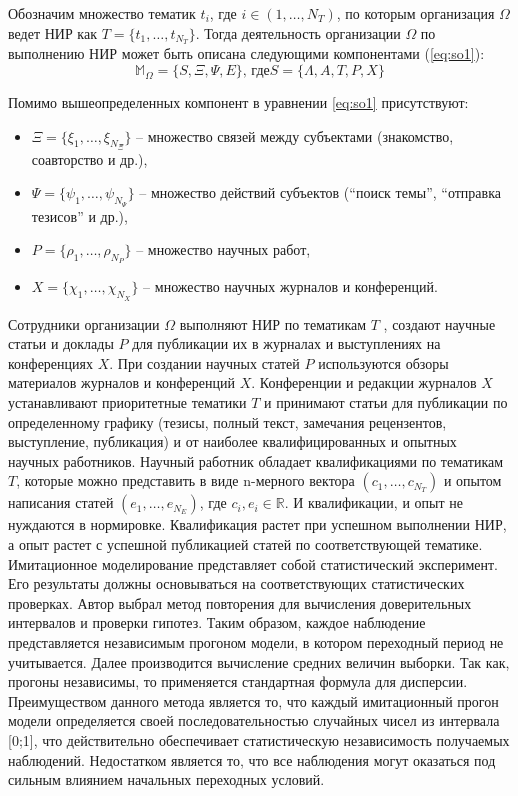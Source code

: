 Обозначим множество тематик $t_i$, где $i \in (1, \dots, N_T )$, по которым организация $\Omega$ ведет НИР как $T = \{ t_1, \dots , t_{N_T} \}$. Тогда деятельность организации $\Omega$ по выполнению НИР может быть описана следующими компонентами (\ref{eq:so1}):
\begin{equation} 
\label{eq:so1}
\mathbb{M}_{\Omega} = \bigg \{ S, \Xi, \Psi, E \bigg \} \mbox {, где}  S = \{ \Lambda, A, T, P, X \}
\end{equation} 

Помимо вышеопределенных компонент в уравнении \ref{eq:so1} присутствуют:

\begin{itemize}
\item $ \Xi = \{ \xi_1 , \dots , \xi_{N_{\Xi}} \} $ -- множество связей между субъектами (знакомство, соавторство и др.),
\item $ \Psi = \{ \psi_1 , \dots , \psi_{N_{\Psi}} \} $ -- множество действий субъектов (``поиск темы'', ``отправка тезисов'' и др.),
\item $ P = \{ \rho_1 , \dots , \rho_{N_P} \} $ -- множество научных работ,
\item $ X = \{ \chi_1 , \dots , \chi_{N_X}  \} $ -- множество научных журналов и конференций.
\end{itemize}

Сотрудники  организации $\Omega$  выполняют НИР по тематикам $T$ , создают научные статьи и доклады $P$ для публикации их в журналах и выступлениях на конференциях $X$.
При создании научных статей $P$ используются обзоры материалов журналов и конференций $X$.
Конференции и редакции журналов $X$ устанавливают приоритетные тематики $T$ и принимают статьи для публикации по определенному графику (тезисы, полный текст, замечания рецензентов, выступление, публикация) и от наиболее квалифицированных и опытных научных работников.
Научный работник обладает квалификациями по тематикам $T$, которые можно представить в виде n-мерного вектора $(c_1, \dots , c_{N_T} )$ и опытом написания статей $(e_1 , \dots , e_{N_E} )$, где $c_i,e_i \in \mathbb{R}$. 
И квалификации, и опыт не нуждаются в нормировке. 
Квалификация растет при успешном выполнении НИР, а опыт растет с успешной публикацией статей по соответствующей тематике.
Имитационное моделирование представляет собой статистический эксперимент. 
Его результаты должны основываться на соответствующих статистических проверках. 
Автор выбрал метод повторения для вычисления доверительных интервалов и проверки гипотез.
Таким образом, каждое наблюдение представляется независимым прогоном модели, в котором переходный период не учитывается.
Далее производится вычисление средних величин выборки. 
Так как, прогоны независимы, то применяется стандартная формула для дисперсии.
Преимуществом данного метода является то, что каждый имитационный прогон модели определяется своей последовательностью случайных чисел из интервала [0;1], что действительно обеспечивает статистическую независимость получаемых наблюдений. 
Недостатком является то, что все наблюдения могут оказаться под сильным влиянием начальных переходных условий.

